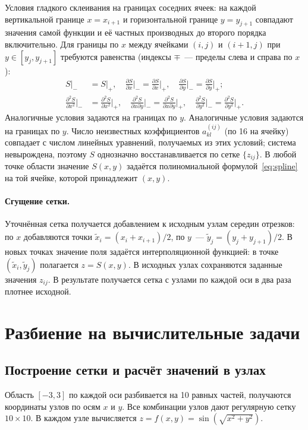 \documentclass[a4paper, 14pt]{extarticle}
\begin{document}
Условия гладкого склеивания на границах соседних ячеек: на каждой вертикальной границе $x = x_{i+1}$ и горизонтальной границе $y = y_{j+1}$ совпадают значения самой функции и её частных производных до второго порядка включительно. Для границы по $x$ между ячейками $(i,j)$ и $(i+1,j)$ при $y \in [y_j, y_{j+1}]$ требуются равенства (индексы $\mp$~--- пределы слева и справа по $x$):
\begin{equation}
\begin{aligned}
S\big|_{-} &= S\big|_{+}, \quad \frac{\partial S}{\partial x}\bigg|_{-} = \frac{\partial S}{\partial x}\bigg|_{+}, \quad \frac{\partial S}{\partial y}\bigg|_{-} = \frac{\partial S}{\partial y}\bigg|_{+};\\
\frac{\partial^2 S}{\partial x^2}\bigg|_{-} &= \frac{\partial^2 S}{\partial x^2}\bigg|_{+}, \quad \frac{\partial^2 S}{\partial x \partial y}\bigg|_{-} = \frac{\partial^2 S}{\partial x \partial y}\bigg|_{+}, \quad \frac{\partial^2 S}{\partial y^2}\bigg|_{-} = \frac{\partial^2 S}{\partial y^2}\bigg|_{+}.
\end{aligned}
\end{equation}
Аналогичные условия задаются на границах по $y$. Аналогичные условия задаются на границах по $y$. Число неизвестных коэффициентов $a_{kl}^{(ij)}$ (по 16 на ячейку) совпадает с числом линейных уравнений, получаемых из этих условий; система невырождена, поэтому $S$ однозначно восстанавливается по сетке $\{z_{ij}\}$. В любой точке области значение $S(x, y)$ задаётся полиномиальной формулой~\eqref{eq:spline} на той ячейке, которой принадлежит $(x, y)$.

\paragraph{Сгущение сетки.} Уточнённая сетка получается добавлением к исходным узлам середин отрезков: по $x$ добавляются точки $\widetilde{x}_i = (x_i + x_{i+1})/2$, по $y$~--- $\widetilde{y}_j = (y_j + y_{j+1})/2$. В новых точках значение поля задаётся интерполяционной функцией: в точке $(\widetilde{x}_i, \widetilde{y}_j)$ полагается $z = S(x, y)$. В исходных узлах сохраняются заданные значения $z_{ij}$. В результате получается сетка с узлами по каждой оси в два раза плотнее исходной.

\section{Разбиение на вычислительные задачи}

\subsection{Построение сетки и расчёт значений в узлах}
Область $[-3, 3]$ по каждой оси разбивается на 10 равных частей, получаются координаты узлов по осям $x$ и $y$. Все комбинации узлов дают регулярную сетку $10 \times 10$. В каждом узле вычисляется $z = f(x, y) = \sin(\sqrt{x^2 + y^2})$.
\end{document}
